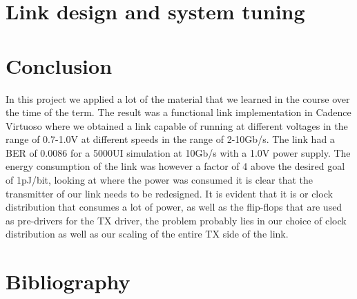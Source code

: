 \documentclass[12pt,journal,compsoc,onecolumn]{IEEEtran}
\begin{document}
\cleardoublepage
\section{Link design and system tuning}





\section{Conclusion}
In this project we applied a lot of the material that we learned in the course over the time of the term. The result was a functional link implementation in Cadence Virtuoso where we obtained a link capable of running at different voltages in the range of 0.7-1.0V at different speeds in the range of 2-10Gb/s. The link had a BER of 0.0086 for a 5000UI simulation at 10Gb/s with a 1.0V power supply. The energy consumption of the link was however a factor of 4 above the desired goal of 1pJ/bit, looking at where the power was consumed it is clear that the transmitter of our link needs to be redesigned. It is evident that it is or clock distribution that consumes a lot of power, as well as the flip-flops that are used as pre-drivers for the TX driver, the problem probably lies in our choice of clock distribution as well as our scaling of the entire TX side of the link.


%



\ifCLASSOPTIONcaptionsoff
  \newpage
\fi

\newpage
\section{Bibliography}
{}

\end{document}
